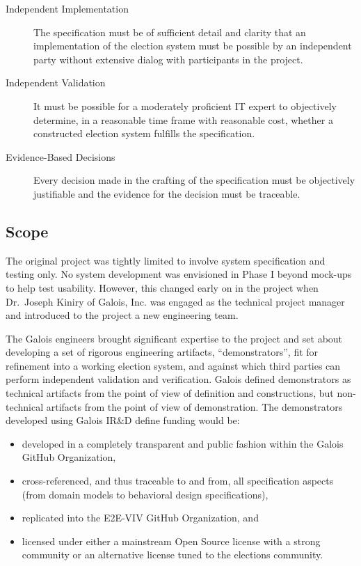 \begin{description}
\item[Independent Implementation] The specification must be of
  sufficient detail and clarity that an implementation of the election
  system must be possible by an independent party without extensive
  dialog with participants in the project.
\item[Independent Validation] It must be possible for a moderately
  proficient IT expert to objectively determine, in a reasonable time
  frame with reasonable cost, whether a constructed election system
  fulfills the specification.
\item[Evidence-Based Decisions] Every decision made in the crafting of
  the specification must be objectively justifiable and the evidence
  for the decision must be traceable.
\end{description}

\subsection{Scope}
\label{sec:scope}

The original project was tightly limited to involve system
specification and testing only. No system development was envisioned
in Phase I beyond mock-ups to help test usability. However, this
changed early on in the project when Dr.~Joseph Kiniry of Galois, Inc.
was engaged as the technical project manager and introduced to the project
a new engineering team. 

The Galois engineers brought significant expertise to the project and
set about developing a set of rigorous engineering artifacts,
``demonstrators'', fit for refinement into a working election system,
and against which third parties can perform independent validation and
verification. Galois defined demonstrators as technical
artifacts from the point of view of definition and constructions, but
non-technical artifacts from the point of view of
demonstration. The demonstrators developed using
Galois IR\&D {define} funding would be:
\begin{itemize}
\item developed in a completely transparent and public fashion within
  the Galois GitHub Organization,
\item cross-referenced, and thus traceable to and from, all
  specification aspects (from domain models to behavioral design
  specifications),
\item replicated into the E2E-VIV GitHub Organization, and
\item licensed under either a mainstream Open Source license with a
  strong community or an alternative license tuned to the elections
  community.
\end{itemize}

